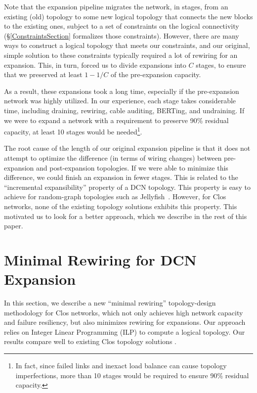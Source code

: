 \documentclass[letterpaper,twocolumn,10pt]{article}
\begin{document}

Note that the expansion pipeline migrates the network, in stages, from an existing (old) topology to some new logical topology that connects the new blocks to the existing ones, subject to a set of constraints on the logical connectivity (\S\ref{ConstraintsSection} formalizes those constraints).  However, there are many ways to construct a logical topology that meets our constraints, and our original, simple solution to these constraints typically required a lot of rewiring for an expansion. This, in turn, forced us to divide expansions into $C$ stages, to ensure that we preserved at least $1-1/C$ of the pre-expansion capacity.  

As a result, these expansions took a long time, especially if the pre-expansion network was highly utilized.  In our experience, each stage takes considerable time, including draining, rewiring, cable auditing, BERTing, and undraining. If we were to expand a network with a requirement to preserve 90\% residual capacity, at least 10 stages would be needed\footnote{In fact, since failed links and inexact load balance can cause topology imperfections, more than 10 stages would be required to ensure 90\% residual capacity.}.

The root cause of the length of our original expansion pipeline is that it does not attempt to  optimize the difference (in terms of wiring changes) between pre-expansion and post-expansion topologies. If we were able to minimize this difference, we could finish an expansion in fewer stages. This is related to the ``incremental expansibility'' property of a DCN topology. This property is easy to achieve for random-graph topologies such as Jellyfish~\cite{Jellyfish}. However, for Clos networks, none of the existing topology solutions exhibits this property. This motivated us to look for a better approach, which we describe in the rest of this paper.
\section{Minimal Rewiring for DCN Expansion}
In this section, we describe a new ``minimal rewiring'' topology-design methodology for Clos networks, which not only achieves high network capacity and failure resiliency, but also minimizes rewiring for expansions. Our approach relies on Integer Linear Programming (ILP) to compute a logical topology. Our results compare well to existing Clos topology solutions \cite{JupiterRising,CiscoDcn,VL2,WCMP}.
\end{document}
